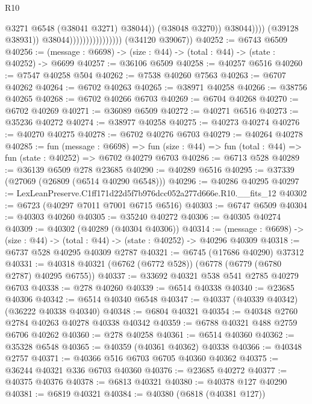 \begin{lexlean}{R10}
\begin{coremodule}
                                                      @3271
                                                      @6548
                                                      (@38041 @3271)
                                                      @38044))
                                                  (@38048 @3270))
                                                @38044))))
                                        (@39128 @38931))
                                      @38044))))))))))))))))
      (@34120 @39067))
@40252 := @6743 @6509
@40256 := (message : @6698) -> (size : @44) -> (total : @44) -> (state : @40252) -> @6699
@40257 := @36106 @6509
@40258 := @40257 @6516
@40260 := @7547 @40258 @504
@40262 := @7538 @40260 @7563
@40263 := @6707 @40262
@40264 := @6702 @40263
@40265 := @38971 @40258
@40266 := @38756 @40265
@40268 := @6702 @40266 @6703
@40269 := @6704 @40268
@40270 := @6702 @40269
@40271 := @36089 @6509
@40272 := @40271 @6516
@40273 := @35236 @40272
@40274 := @38977 @40258
@40275 := @40273 @40274
@40276 := @40270 @40275
@40278 := @6702 @40276 @6703
@40279 := @40264 @40278
@40285 := fun (message : @6698) =>
  fun (size : @44) => fun (total : @44) => fun (state : @40252) => @6702 @40279 @6703
@40286 := @6713 @528
@40289 := @36139 @6509 @278 @23685
@40290 := @40289 @6516
@40295 := @37339 (@27069 (@26809 (@6514 @40290 @6548)))
@40296 := @40286 @40295
@40297 := LexLeanPreserve.C1ff171d22d5f7b976dcc052a277d666e.R10.__fits_12
@40302 := @6723 (@40297 @7011 @7001 @6715 @6516)
@40303 := @6747 @6509
@40304 := @40303 @40260
@40305 := @35240 @40272
@40306 := @40305 @40274
@40309 := @40302 (@40289 (@40304 @40306))
@40314 := (message : @6698) -> (size : @44) -> (total : @44) -> (state : @40252) -> @40296 @40309
@40318 := @6737 @528 @40295 @40309 @2787
@40321 := @6745 (@17686 @40290) @37312
@40331 := @40318 @40321 (@6762 (@6772 @528)) (@6778 (@6779 (@6780 @2787) @40295 @6755))
@40337 := @33692 @40321 @538 @541 @2785 @40279 @6703
@40338 := @278 @40260
@40339 := @6514 @40338
@40340 := @23685 @40306
@40342 := @6514 @40340 @6548
@40347 := @40337 (@40339 @40342) (@36222 @40338 @40340)
@40348 := @6804 @40321
@40354 := @40348 @2760 @2784 @40263 @40278 @40338 @40342
@40359 := @6788 @40321 @488 @2759 @6706 @40262
@40360 := @278 @40258
@40361 := @6514 @40360
@40362 := @35328 @6548
@40365 := @40359 (@40361 @40362) @40338
@40366 := @40348 @2757
@40371 := @40366 @516 @6703 @6705 @40360 @40362
@40375 := @36244 @40321 @336 @6703 @40360
@40376 := @23685 @40272
@40377 := @40375 @40376
@40378 := @6813 @40321
@40380 := @40378 @127 @40290
@40381 := @6819 @40321
@40384 := @40380 (@6818 (@40381 @127))

\end{coremodule}
\end{lexlean}
